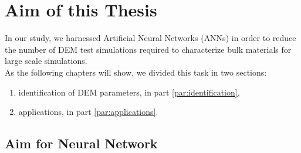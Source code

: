 
\chapter{Aim of this Thesis}
\label{cap:aim}

In our study, we harnessed Artificial Neural Networks (\acs{ANNs}) in order to
reduce the number of \acs{DEM} test simulations required
to characterize bulk materials for large scale simulations. \\
As the following chapters will show, we divided this task in two sections:
\begin{enumerate}
  \item{identification of \acs{DEM} parameters, in part
  \ref{par:identification},}
  \item{applications, in part \ref{par:applications}.}
\end{enumerate}

\section{Aim for Neural Network}
\label{sec:aimforneuralnetwork}

